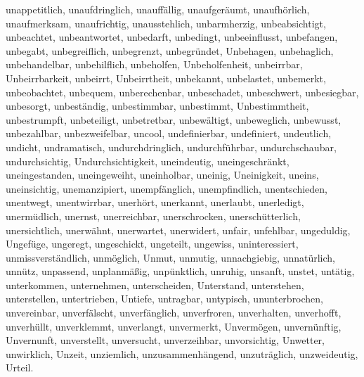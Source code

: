 \documentclass[a4paper,10pt,fleqn,twocolumn,twoside,dvipdfmx]{scrartcl}
\begin{document}
unappetitlich,
unaufdringlich,
unauffällig,
unaufgeräumt,
unaufhörlich,
unaufmerksam,
unaufrichtig,
unausstehlich,
unbarmherzig,
unbeabsichtigt,
unbeachtet,
unbeantwortet,
unbedarft,
unbedingt,
unbeeinflusst,
unbefangen,
unbegabt,
unbegreiflich,
unbegrenzt,
unbegründet,
Unbehagen,
unbehaglich,
unbehandelbar,
unbehilflich,
unbeholfen,
Unbeholfenheit,
unbeirrbar,
Unbeirrbarkeit,
unbeirrt,
Unbeirrtheit,
unbekannt,
unbelastet,
unbemerkt,
unbeobachtet,
unbequem,
unberechenbar,
unbeschadet,
unbeschwert,
unbesiegbar,
unbesorgt,
unbeständig,
unbestimmbar,
unbestimmt,
Unbestimmtheit,
unbestrumpft,
unbeteiligt,
unbetretbar,
unbewältigt,
unbeweglich,
unbewusst,
unbezahlbar,
unbezweifelbar,
uncool,
undefinierbar,
undefiniert,
undeutlich,
undicht,
undramatisch,
undurchdringlich,
undurchführbar,
undurchschaubar,
undurchsichtig,
Undurchsichtigkeit,
uneindeutig,
uneingeschränkt,
uneingestanden,
uneingeweiht,
uneinholbar,
uneinig,
Uneinigkeit,
uneins,
uneinsichtig,
unemanzipiert,
unempfänglich,
unempfindlich,
unentschieden,
unentwegt,
unentwirrbar,
unerhört,
unerkannt,
unerlaubt,
unerledigt,
unermüdlich,
unernst,
unerreichbar,
unerschrocken,
unerschütterlich,
unersichtlich,
unerwähnt,
unerwartet,
unerwidert,
unfair,
unfehlbar,
ungeduldig,
Ungefüge,
ungeregt,
ungeschickt,
ungeteilt,
ungewiss,
uninteressiert,
unmissverständlich,
unmöglich,
Unmut,
unmutig,
unnachgiebig,
unnatürlich,
unnütz,
unpassend,
unplanmäßig,
unpünktlich,
unruhig,
unsanft,
unstet,
untätig,
unterkommen,
unternehmen,
unterscheiden,
Unterstand,
unterstehen,
unterstellen,
untertrieben,
Untiefe,
untragbar,
untypisch,
ununterbrochen,
unvereinbar,
unverfälscht,
unverfänglich,
unverfroren,
unverhalten,
unverhofft,
unverhüllt,
unverklemmt,
unverlangt,
unvermerkt,
Unvermögen,
unvernünftig,
Unvernunft,
unverstellt,
unversucht,
unverzeihbar,
unvorsichtig,
Unwetter,
unwirklich,
Unzeit,
unziemlich,
unzusammenhängend,
unzuträglich,
unzweideutig,
Urteil.
\end{document}

